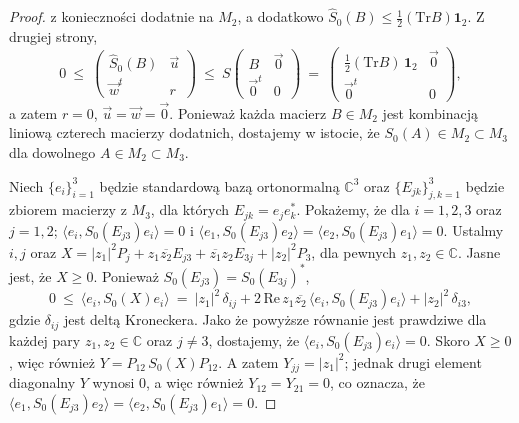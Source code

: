{\begin{proof}
z konieczności dodatnie na $M_{2}$, a dodatkowo
$\hat{S}_{0}(B) \leq \frac{1}{2} (\text{Tr} B) \mathbf{1}_{2}$.
Z drugiej strony,
\begin{equation}
 0 \: \leq \:
 \begin{pmatrix}
  \hat{S}_{0}(B) & \vec{u} \\ \vec{w}^{t} & r
 \end{pmatrix} \: \leq \:
            S \begin{pmatrix}
               B & \vec{0} \\ \vec{0}^{t} & 0
              \end{pmatrix} \: = \:
 \begin{pmatrix}
  \frac{1}{2} (\text{Tr} B) \, \mathbf{1}_{2} & \vec{0} \\ \vec{0}^{t} & 0
 \end{pmatrix},
\end{equation}
a zatem $r=0$, $\vec{u}=\vec{w}=\vec{0}$.
Ponieważ każda macierz $B \in M_{2}$ jest kombinacją liniową czterech macierzy
dodatnich, dostajemy w istocie, że
$S_{0}(A) \in M_{2} \! \subset \! M_{3}$
dla dowolnego $A \in M_{2} \! \subset \! M_{3}$.

Niech $\{e_{i}\}_{i=1}^{3}$ będzie standardową
bazą ortonormalną $\mathbb{C}^{3}$
oraz $\{ E_{jk} \}_{j,k=1}^{3}$ będzie zbiorem macierzy z $M_{3}$,
dla których $E_{jk} = e_{j} e_{k}^{*}$.
Pokażemy, że dla $i = 1,2,3$ oraz $j=1,2$;
$\langle e_{i}, S_{0}(E_{j3}) e_{i} \rangle = 0$
i $\langle e_{1}, S_{0}(E_{j3}) e_{2} \rangle =
    \langle e_{2}, S_{0}(E_{j3}) e_{1} \rangle = 0$.
Ustalmy $i,j$ oraz
$X = |z_{1}|^{2} P_{j} + z_{1} \overline{z_{2}} E_{j3} +
\overline{z_{1}} z_{2} E_{3j} + |z_{2}|^{2} P_{3}$,
dla pewnych $z_{1}, z_{2} \in \mathbb{C}$.
Jasne jest, że $X \geq 0$.
Ponieważ $S_{0}(E_{j3}) = S_{0}(E_{3j})^{*}$,
\begin{equation}
0 \: \leq \: \langle e_{i}, S_{0}(X) e_{i} \rangle \: = \:
|z_{1}|^{2} \, \delta_{ij} +
2 \, \text{Re} \, z_{1} \overline{z_{2}} \,
    \langle e_{i}, S_{0}(E_{j3}) e_{i} \rangle +
|z_{2}|^{2} \, \delta_{i3},
\end{equation}
gdzie $\delta_{ij}$ jest deltą Kroneckera.
Jako że powyższe równanie jest prawdziwe dla każdej pary
$z_{1}, z_{2} \in \mathbb{C}$ oraz $j \neq 3$,
dostajemy, że $\langle e_{i}, S_{0}(E_{j3}) e_{i} \rangle =0$.
Skoro $X \geq 0$, więc również $Y = P_{12} \, S_{0}(X) P_{12}$.
A zatem $Y_{jj} = |z_{1}|^{2}$;
jednak drugi element diagonalny $Y$ wynosi 0, a więc również
$Y_{12} = Y_{21} = 0$,
co oznacza, że
$\langle e_{1}, S_{0}(E_{j3}) e_{2} \rangle
    = \langle e_{2}, S_{0}(E_{j3}) e_{1} \rangle = 0$.


\end{proof}}
